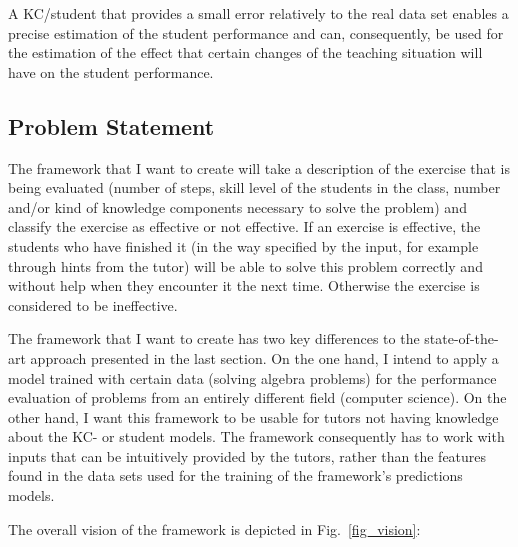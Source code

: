 A KC/student that provides a small error relatively to the real data set enables a precise estimation of the student performance and can, consequently, be used for the estimation of the effect that certain changes of the teaching situation will have on the student performance.


\subsection{Problem Statement}\label{la_problem_statement}
The framework that I want to create will take a description of the exercise that is being evaluated (number of steps, skill level of the students in the class, number and/or kind of knowledge components necessary to solve the problem) and classify the exercise as effective or not effective. If an exercise is effective, the students who have finished it (in the way specified by the input, for example through hints from the tutor) will be able to solve this problem correctly and without help when they encounter it the next time. Otherwise the exercise is considered to be ineffective.

The framework that I want to create has two key differences to the state-of-the-art approach presented in the last section. On the one hand, I intend to apply a model trained with certain data (solving algebra problems) for the performance evaluation of problems from an entirely different field (computer science). On the other hand, I want this framework to be usable for tutors not having knowledge about the KC- or student models. The framework consequently has to work with inputs that can be intuitively provided by the tutors, rather than the features found in the data sets used for the training of the framework’s predictions models.

The overall vision of the framework is depicted in Fig.~\ref{fig_vision}:

